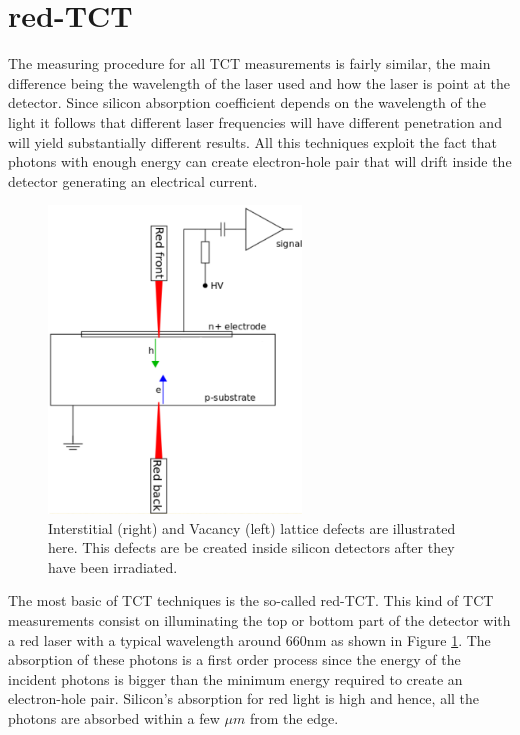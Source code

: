 \section{red-TCT} %
\label{sec:redTCT}

The measuring procedure for all TCT measurements is fairly similar, the main difference being the wavelength of the laser used and how the laser is point at the detector. Since silicon absorption coefficient depends on the wavelength of the light it follows that different laser frequencies will have different penetration and will yield substantially different results. All this techniques exploit the fact that photons with enough energy can create electron-hole pair that will drift inside the detector generating an electrical current. 

\begin{figure}[H]
	\centering
	\includegraphics[width=0.6\textwidth]{chap4_redTCT.png}
	\caption{Interstitial (right) and Vacancy (left) lattice defects are illustrated here. This defects are be created inside silicon detectors after they have been irradiated.}
	\label{fig:redTCT}
\end{figure}

The most basic of TCT techniques is the so-called red-TCT. This kind of TCT measurements consist on illuminating the top or bottom part of the detector with a red laser with a typical wavelength around 660nm as shown in Figure \ref{fig:redTCT}. The absorption of these photons is a first order process since the energy of the incident photons is bigger than the minimum energy required to create an electron-hole pair. Silicon's absorption for red light is high and hence, all the photons are absorbed within a few $\mu m$ from the edge. 

